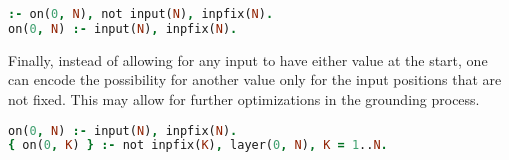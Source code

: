 \begin{lstlisting}[language=Prolog, numbers=none]
:- on(0, N), not input(N), inpfix(N).
on(0, N) :- input(N), inpfix(N).
\end{lstlisting}

Finally, instead of allowing for any input to have either value at the start,
one can encode the possibility for another value only for the input positions
that are not fixed. This may allow for further optimizations in the grounding process.

\begin{lstlisting}[language=Prolog, numbers=none]
on(0, N) :- input(N), inpfix(N).
{ on(0, K) } :- not inpfix(K), layer(0, N), K = 1..N.
\end{lstlisting}
